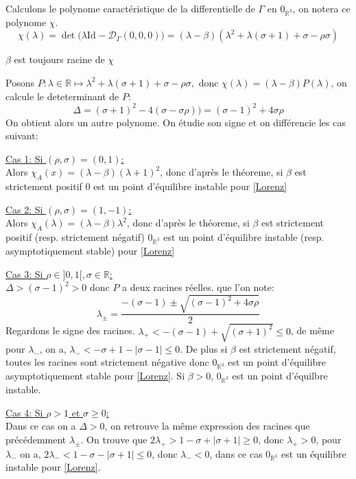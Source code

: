 \documentclass{article}
\newcommand{\R}{\mathbb{R}}
\newcommand{\id}[1][]{\ensuremath{\mathrm{Id}_{#1}}}
\newtheorem[M]{prop}{Proposition}[section]
\newtheorem[M]{propt}{Propriété}[section]
\newtheorem[L]{thm}{Théoreme}
\newtheorem[L]{cor}{Corollaire}
\begin{document}
Calculons le polynome caractéristique de la differentielle de $\Gamma$ en $0_{\R^3}$, on notera ce polynome $\chi$.
\[
    \chi (\lambda) = \det\big(\lambda\id - \mathcal{D}_{\Gamma}(0,0,0)\big) = (\lambda - \beta)(\lambda^2 + \lambda(\sigma+1)+\sigma-\rho\sigma)
\]
\begin{example}[Remarque]
    $\beta$ est toujours racine de $\chi$
\end{example}
Posons $P:\lambda \in \R \mapsto \lambda^2 + \lambda(\sigma+1)+\sigma-\rho\sigma,\text{ donc }\chi(\lambda)=(\lambda-\beta)P(\lambda)$, on calcule le deteterminant de $P$:
\[
  \Delta = (\sigma+1)^2 - 4(\sigma-\sigma\rho)) = (\sigma-1)^2 +4\sigma\rho
\]
On obtient alors un autre polynome. On étudie son signe et on différencie les cas suivant:

\underline{Cas 1: Si $(\rho,\sigma)=(0,1)$:}\\
Alors $\chi_A(x) = (\lambda-\beta)(\lambda+1)^2$, donc d'après le théoreme, si $\beta$ est strictement positif $0$ est un point d'équilibre instable pour \eqref{Lorenz}

\underline{Cas 2: Si $(\rho,\sigma)=(1,-1)$:}\\
Alors $\chi_A(\lambda) = (\lambda-\beta)\lambda^2$, donc d'après le théoreme, si $\beta$ est strictement positif (resp. strictement négatif) $0_{\R^3}$ est un point d'équilibre instable (resp. asymptotiquement stable) pour \eqref{Lorenz}


\underline{Cas 3: Si $\rho \in ]0,1[, \sigma \in \mathbb{R}$:}\\
$\Delta> (\sigma-1)^2 >0$ donc $P$ a deux racines réelles.
que l'on note: 
\[
    \lambda_\pm = \frac{-(\sigma-1)\pm \sqrt{(\sigma-1)^2 + 4\sigma\rho}}{2}
\]
Regardons le signe des racines. $\lambda_+ < -(\sigma-1)+ \sqrt{(\sigma+1)^2} \le 0 $, de même pour $\lambda_-$, on a, $\lambda_- < - \sigma +1- |\sigma - 1| \le 0$. De plus si $\beta$ est strictement négatif, toutes les racines sont strictement négative donc $0_{\R^3}$ est un point d'équilibre asymptotiquement stable pour \eqref{Lorenz}. Si $\beta > 0$, $0_{\R^3}$ est un point d'équilbre instable.

\underline{Cas 4: Si $\rho > 1$ et $\sigma \ge 0 $: }\\
Dans ce cas on a $\Delta > 0$, on retrouve la même expression des racines que précédemment $\lambda_\pm$. On trouve que $2\lambda_+ > 1-\sigma+|\sigma+1| \ge 0$, donc $\lambda_+ > 0$, pour $\lambda_-$ on a, $2\lambda_- < 1-\sigma-|\sigma+1| \le 0 $, donc $\lambda_- < 0$, dans ce cas $0_{\R^3}$ est un équilibre instable pour \eqref{Lorenz}.
\end{document}
